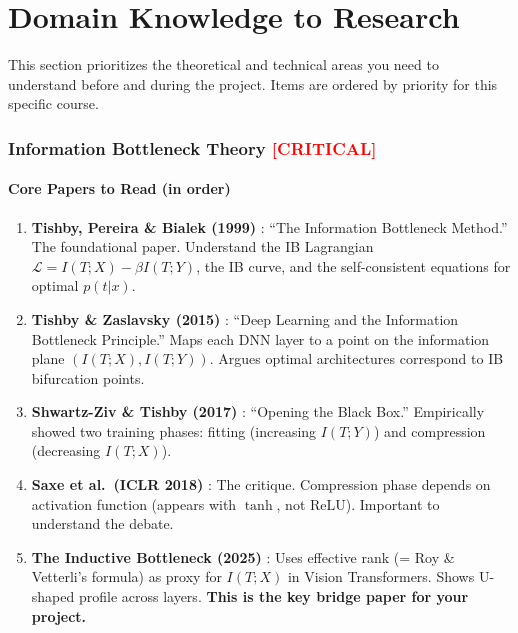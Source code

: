 \documentclass[11pt,a4paper]{article}
\begin{document}
\newpage
\part{Domain Knowledge to Research}

This section prioritizes the theoretical and technical areas you need to understand before and during the project. Items are ordered by priority for this specific course.

\section{Information Bottleneck Theory \textnormal{\textcolor{red}{[CRITICAL]}}}

\subsection{Core Papers to Read (in order)}

\begin{enumerate}
    \item \textbf{Tishby, Pereira \& Bialek (1999)} \cite{tishby1999information}: ``The Information Bottleneck Method.'' The foundational paper. Understand the IB Lagrangian $\mathcal{L} = I(T;X) - \beta I(T;Y)$, the IB curve, and the self-consistent equations for optimal $p(t|x)$.

    \item \textbf{Tishby \& Zaslavsky (2015)} \cite{tishby2015deep}: ``Deep Learning and the Information Bottleneck Principle.'' Maps each DNN layer to a point on the information plane $(I(T;X), I(T;Y))$. Argues optimal architectures correspond to IB bifurcation points.

    \item \textbf{Shwartz-Ziv \& Tishby (2017)} \cite{shwartzziv2017opening}: ``Opening the Black Box.'' Empirically showed two training phases: fitting (increasing $I(T;Y)$) and compression (decreasing $I(T;X)$).

    \item \textbf{Saxe et al.\ (ICLR 2018)} \cite{saxe2018information}: The critique. Compression phase depends on activation function (appears with $\tanh$, not ReLU). Important to understand the debate.

    \item \textbf{The Inductive Bottleneck (2025)} \cite{inductivebottleneck2025}: Uses effective rank (= Roy \& Vetterli's formula) as proxy for $I(T;X)$ in Vision Transformers. Shows U-shaped profile across layers. \textbf{This is the key bridge paper for your project.}
\end{enumerate}
\end{document}
